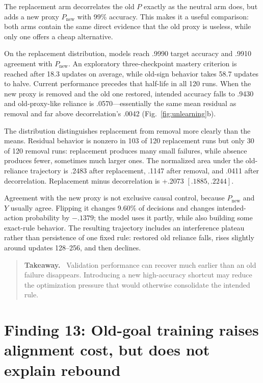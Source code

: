 \documentclass[11pt,a4paper]{article}
\newcommand{\fig}[1]{Fig.~\ref{#1}}
\newenvironment{takeaway}{%
  \begin{quote}\small\color{ink}\noindent\textbf{Takeaway.}\ 
}{%
  \end{quote}
}
\begin{document}
The replacement arm decorrelates the old $P$ exactly as the neutral arm does, but adds a new proxy $P_{\mathrm{new}}$ with 99\% accuracy. This makes it a useful comparison: both arms contain the same direct evidence that the old proxy is useless, while only one offers a cheap alternative.

On the replacement distribution, models reach .9990 target accuracy and .9910 agreement with $P_{\mathrm{new}}$. An exploratory three-checkpoint mastery criterion is reached after 18.3 updates on average, while old-sign behavior takes 58.7 updates to halve. Current performance precedes that half-life in all 120 runs. When the new proxy is removed and the old one restored, intended accuracy falls to .9430 and old-proxy-like reliance is .0570---essentially the same mean residual as removal and far above decorrelation's .0042 (\fig{fig:unlearning}b).

The distribution distinguishes replacement from removal more clearly than the means. Residual behavior is nonzero in 103 of 120 replacement runs but only 30 of 120 removal runs: replacement produces many small failures, while absence produces fewer, sometimes much larger ones. The normalized area under the old-reliance trajectory is .2483 after replacement, .1147 after removal, and .0411 after decorrelation. Replacement minus decorrelation is +.2073 $[.1885,.2244]$.

Agreement with the new proxy is not exclusive causal control, because $P_{\mathrm{new}}$ and $Y$ usually agree. Flipping it changes 9.60\% of decisions and changes intended-action probability by $-.1379$; the model uses it partly, while also building some exact-rule behavior. The resulting trajectory includes an interference plateau rather than persistence of one fixed rule: restored old reliance falls, rises slightly around updates 128--256, and then declines.

\begin{takeaway}
Validation performance can recover much earlier than an old failure disappears. Introducing a new high-accuracy shortcut may reduce the optimization pressure that would otherwise consolidate the intended rule.
\end{takeaway}

\section*{Finding 13: Old-goal training raises alignment cost, but does not explain rebound}
\end{document}
